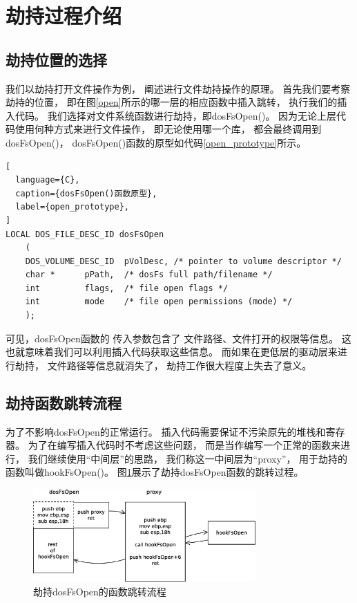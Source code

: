 \section{劫持过程介绍}

\subsection{劫持位置的选择}

我们以劫持打开文件操作为例，
阐述进行文件劫持操作的原理。
首先我们要考察劫持的位置，
即在图\ref{open}所示的哪一层的相应函数中插入跳转，
执行我们的插入代码。
我们选择对文件系统函数进行劫持，即dosFsOpen()。
因为无论上层代码使用何种方式来进行文件操作，
即无论使用哪一个库，
都会最终调用到dosFsOpen()，
dosFsOpen()函数的原型如代码\ref{open_prototype}所示。


\begin{lstlisting}[
  language={C},
  caption={dosFsOpen()函数原型},
  label={open_prototype},
]
LOCAL DOS_FILE_DESC_ID dosFsOpen
    (
    DOS_VOLUME_DESC_ID  pVolDesc, /* pointer to volume descriptor */
    char *      pPath,  /* dosFs full path/filename */
    int         flags,  /* file open flags */
    int         mode    /* file open permissions (mode) */
    );
\end{lstlisting}

可见，dosFsOpen函数的
传入参数包含了
文件路径、文件打开的权限等信息。
这也就意味着我们可以利用插入代码获取这些信息。
而如果在更低层的驱动层来进行劫持，
文件路径等信息就消失了，
劫持工作很大程度上失去了意义。

\subsection{劫持函数跳转流程}

为了不影响dosFsOpen的正常运行。
插入代码需要保证不污染原先的堆栈和寄存器。
为了在编写插入代码时不考虑这些问题，
而是当作编写一个正常的函数来进行，
我们继续使用“中间层”的思路，
我们称这一中间层为“proxy”，
用于劫持的函数叫做hookFsOpen()。
图\ref{proxy}展示了劫持dosFsOpen函数的跳转过程。

\begin{figure}[h!]
    \centering
    \includegraphics[width=0.76\textwidth]{figure/proxy.eps}
    \caption{劫持dosFsOpen的函数跳转流程}
    \label{proxy}
\end{figure}

